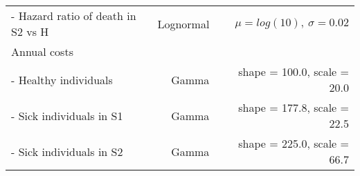 \documentclass[
]{article}
\begin{document}
\begin{longtable}[]{@{}lrr@{}}
\begin{minipage}[t]{0.32\columnwidth}\raggedright
- Hazard ratio of death in S2 vs H\strut
\end{minipage} & \begin{minipage}[t]{0.17\columnwidth}\raggedleft
Lognormal\strut
\end{minipage} & \begin{minipage}[t]{0.42\columnwidth}\raggedleft
\(\mu = log(10), \ \sigma = 0.02\)\strut
\end{minipage}\tabularnewline
\begin{minipage}[t]{0.32\columnwidth}\raggedright
Annual costs\strut
\end{minipage} & \begin{minipage}[t]{0.17\columnwidth}\raggedleft
\strut
\end{minipage} & \begin{minipage}[t]{0.42\columnwidth}\raggedleft
\strut
\end{minipage}\tabularnewline
\begin{minipage}[t]{0.32\columnwidth}\raggedright
- Healthy individuals\strut
\end{minipage} & \begin{minipage}[t]{0.17\columnwidth}\raggedleft
Gamma\strut
\end{minipage} & \begin{minipage}[t]{0.42\columnwidth}\raggedleft
shape = 100.0, scale = 20.0\strut
\end{minipage}\tabularnewline
\begin{minipage}[t]{0.32\columnwidth}\raggedright
- Sick individuals in S1\strut
\end{minipage} & \begin{minipage}[t]{0.17\columnwidth}\raggedleft
Gamma\strut
\end{minipage} & \begin{minipage}[t]{0.42\columnwidth}\raggedleft
shape = 177.8, scale = 22.5\strut
\end{minipage}\tabularnewline
\begin{minipage}[t]{0.32\columnwidth}\raggedright
- Sick individuals in S2\strut
\end{minipage} & \begin{minipage}[t]{0.17\columnwidth}\raggedleft
Gamma\strut
\end{minipage} & \begin{minipage}[t]{0.42\columnwidth}\raggedleft
shape = 225.0, scale = 66.7\strut
\end{minipage}\tabularnewline

\end{longtable}
\end{document}
